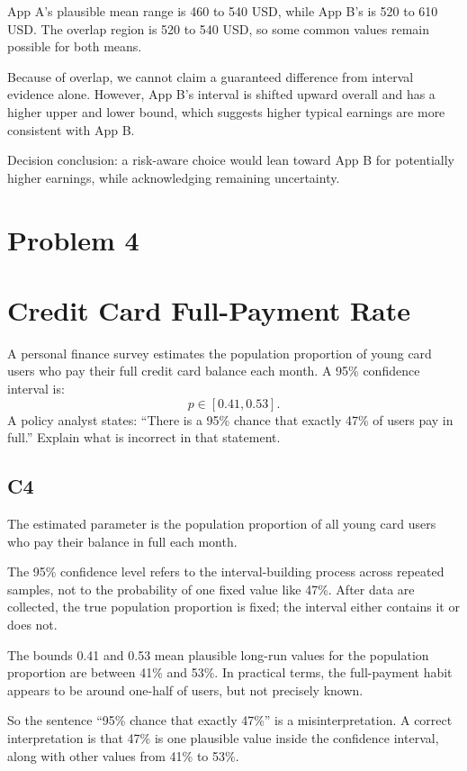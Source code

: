 \begin{ExamProblems}
		App A's plausible mean range is 460 to 540 USD, while App B's is 520 to 610 USD.
		The overlap region is 520 to 540 USD, so some common values remain possible for both means.

		Because of overlap, we cannot claim a guaranteed difference from interval evidence alone.
		However, App B's interval is shifted upward overall and has a higher upper and lower bound, which suggests higher typical earnings are more consistent with App B.

		Decision conclusion: a risk-aware choice would lean toward App B for potentially higher earnings, while acknowledging remaining uncertainty.

		\newpage
		\item
		\section{Problem 4}
		\section{Credit Card Full-Payment Rate}
		A personal finance survey estimates the population proportion of young card users who pay their full credit card balance each month.
		A 95\% confidence interval is:
		\[
		p \in [0.41, 0.53].
		\]
		A policy analyst states: ``There is a 95\% chance that exactly 47\% of users pay in full.''
		Explain what is incorrect in that statement.

		\subsection*{C4}
		The estimated parameter is the population proportion of all young card users who pay their balance in full each month.

		The 95\% confidence level refers to the interval-building process across repeated samples, not to the probability of one fixed value like 47\%.
		After data are collected, the true population proportion is fixed; the interval either contains it or does not.

		The bounds 0.41 and 0.53 mean plausible long-run values for the population proportion are between 41\% and 53\%.
		In practical terms, the full-payment habit appears to be around one-half of users, but not precisely known.

		So the sentence ``95\% chance that exactly 47\%'' is a misinterpretation.
		A correct interpretation is that 47\% is one plausible value inside the confidence interval, along with other values from 41\% to 53\%.


\end{ExamProblems}
